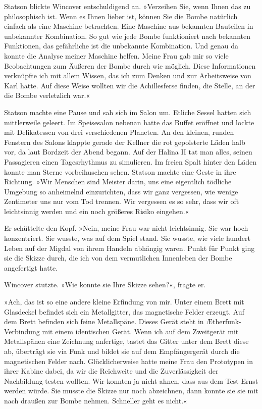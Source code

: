 Statson blickte Wincover entschuldigend an. »Verzeihen Sie, wenn
Ihnen das zu philosophisch ist. Wenn es Ihnen lieber ist, können
Sie die Bombe natürlich einfach als eine Maschine betrachten. Eine
Maschine aus bekannten Bauteilen in unbekannter Kombination. So gut
wie jede Bombe funktioniert nach bekannten Funktionen, das
gefährliche ist die unbekannte Kombination. Und genau da konnte die
Analyse meiner Maschine helfen. Meine Frau gab mir so viele
Beobachtungen zum Äußeren der Bombe durch wie möglich. Diese
Informationen verknüpfte ich mit allem Wissen, das ich zum Denken
und zur Arbeitsweise von Karl hatte. Auf diese Weise wollten wir
die Achillesferse finden, die Stelle, an der die Bombe verletzlich
war.«

Statson machte eine Pause und sah sich im Salon um. Etliche Sessel
hatten sich mittlerweile geleert. Im Speisesalon nebenan hatte das
Buffet eröffnet und lockte mit Delikatessen von drei verschiedenen
Planeten. An den kleinen, runden Fenstern des Salons klappte gerade
der Kellner die rot gepolsterte Läden halb vor, da laut Bordzeit
der Abend begann. Auf der Halina II tat man alles, seinen
Passagieren einen Tagesrhythmus zu simulieren. Im freien Spalt
hinter den Läden konnte man Sterne vorbeihuschen sehen. Statson
machte eine Geste in ihre Richtung. »Wir Menschen sind Meister
darin, uns eine eigentlich tödliche Umgebung so anheimelnd
einzurichten, dass wir ganz vergessen, wie wenige Zentimeter uns
nur vom Tod trennen. Wir vergessen es so sehr, dass wir oft
leichtsinnig werden und ein noch größeres Risiko eingehen.«

Er schüttelte den Kopf. »Nein, meine Frau war nicht leichtsinnig.
Sie war hoch konzentriert. Sie wusste, was auf dem Spiel stand. Sie
wusste, wie viele hundert Leben auf der Migdal von ihrem Handeln
abhängig waren. Punkt für Punkt ging sie die Skizze durch, die ich
von dem vermutlichen Innenleben der Bombe angefertigt hatte.

Wincover stutzte. »Wie konnte sie Ihre Skizze sehen?«, fragte er.

»Ach, das ist so eine andere kleine Erfindung von mir. Unter einem
Brett mit Glasdeckel befindet sich ein Metallgitter, das
magnetische Felder erzeugt. Auf dem Brett befinden sich feine
Metallspäne. Dieses Gerät steht in Ætherfunk-Verbindung mit einem
identischen Gerät. Wenn ich auf dem Zweitgerät mit Metallspänen
eine Zeichnung anfertige, tastet das Gitter unter dem Brett diese
ab, überträgt sie via Funk und bildet sie auf dem Empfängergerät
durch die magnetischen Felder nach. Glücklicherweise hatte meine
Frau den Prototypen in ihrer Kabine dabei, da wir die Reichweite
und die Zuverlässigkeit der Nachbildung testen wollten. Wir konnten
ja nicht ahnen, dass aus dem Test Ernst werden würde. Sie musste
die Skizze nur noch abzeichnen, dann konnte sie sie mit nach
draußen zur Bombe nehmen. Schneller geht es nicht.«

